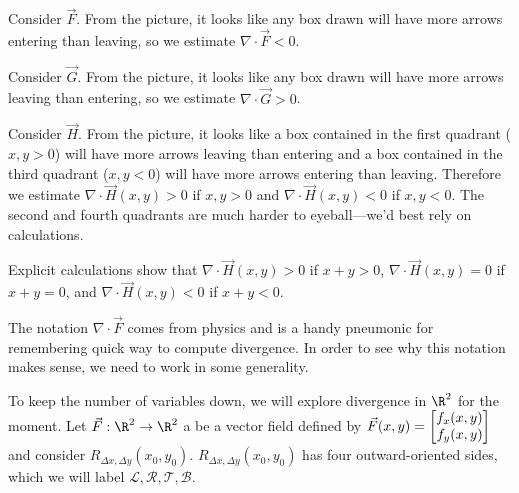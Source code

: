 \begin{example}
\begin{center}
	\end{center}

	Consider $\vec F$.  From the picture, it looks like any box drawn will have
	more arrows entering than leaving, so we estimate $\nabla \cdot \vec F < 0$.

	Consider $\vec G$.  From the picture, it looks like any box drawn will have more arrows
	leaving than entering, so we estimate $\nabla \cdot \vec G > 0$.

	Consider $\vec H$.  From the picture, it looks like a box contained
	in the first quadrant ($x,y>0$) will have more arrows leaving than entering and
	a box contained in the third quadrant ($x,y<0$) will have more arrows entering than
	leaving.  Therefore we estimate $\nabla \cdot \vec H(x,y)>0$ if $x,y>0$ and $\nabla \cdot \vec H(x,y)<0$
	if $x,y<0$.  The second and fourth quadrants are much harder to eyeball---we'd best rely on calculations.

	Explicit calculations show that $\nabla \cdot \vec H(x,y)>0$ if $x+y>0$, $\nabla \cdot \vec H(x,y)=0$ if $x+y=0$,
	and $\nabla \cdot \vec H(x,y)<0$ if $x+y<0$.
\end{example}

The notation $\nabla \cdot \vec F$ comes from physics and is a handy pneumonic
for remembering quick way to compute divergence.  In order to see why this notation
makes sense, we need to work in some generality.

\bigskip
To keep the number of variables down, we will explore divergence in $\R^2$ for the moment.
Let $\vec F:\R^2\to\R^2$ a be a vector field defined by
$\vec F(x,y)=\mat{f_x(x,y)\\f_y(x,y)}$ and consider $R_{\Delta x,\Delta y}(x_0,y_0)$.
$R_{\Delta x,\Delta y}(x_0,y_0)$ has four outward-oriented sides, which we will label $\mathcal L,\mathcal R,\mathcal T,\mathcal B$.

